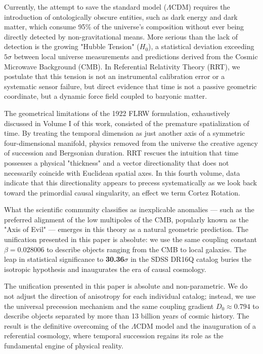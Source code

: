 \documentclass[12pt, a4paper]{article}
\begin{document}
Currently, the attempt to save the standard model ($\Lambda$CDM) requires the introduction of ontologically obscure entities, such as dark energy and dark matter, which consume 95\% of the universe's composition without ever being directly detected by non-gravitational means. More serious than the lack of detection is the growing "Hubble Tension" ($H_0$), a statistical deviation exceeding $5\sigma$ between local universe measurements and predictions derived from the Cosmic Microwave Background (CMB). In Referential Relativity Theory (RRT), we postulate that this tension is not an instrumental calibration error or a systematic sensor failure, but direct evidence that time is not a passive geometric coordinate, but a dynamic force field coupled to baryonic matter.

The geometrical limitations of the 1922 FLRW formulation, exhaustively discussed in Volume I of this work, consisted of the premature spatialization of time. By treating the temporal dimension as just another axis of a symmetric four-dimensional manifold, physics removed from the universe the creative agency of succession and Bergsonian duration. RRT rescues the intuition that time possesses a physical "thickness" and a vector directionality that does not necessarily coincide with Euclidean spatial axes. In this fourth volume, data indicate that this directionality appears to precess systematically as we look back toward the primordial causal singularity, an effect we term Cortez Rotation.

What the scientific community classifies as inexplicable anomalies --- such as the preferred alignment of the low multipoles of the CMB, popularly known as the "Axis of Evil" --- emerges in this theory as a natural geometric prediction. The unification presented in this paper is absolute: we use the same coupling constant $\beta = 0.028006$ to describe objects ranging from the CMB to local galaxies. The leap in statistical significance to \textbf{30.36$\sigma$} in the SDSS DR16Q catalog buries the isotropic hypothesis and inaugurates the era of causal cosmology.

The unification presented in this paper is absolute and non-parametric. We do not adjust the direction of anisotropy for each individual catalog; instead, we use the universal precession mechanism and the same coupling gradient $D_0 \approx 0.794$ to describe objects separated by more than 13 billion years of cosmic history. The result is the definitive overcoming of the $\Lambda$CDM model and the inauguration of a referential cosmology, where temporal succession regains its role as the fundamental engine of physical reality.
\end{document}
